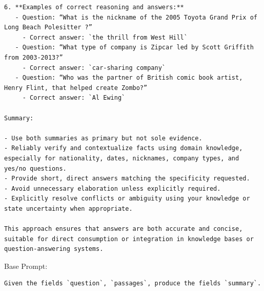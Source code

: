 \begin{instructbox}
\begin{lstlisting}[breakindent=0pt, breaklines=true, breakatwhitespace=true, frame=single, backgroundcolor=\color{blue!10}]
6. **Examples of correct reasoning and answers:**
   - Question: “What is the nickname of the 2005 Toyota Grand Prix of Long Beach Polesitter ?”
     - Correct answer: `the thrill from West Hill`
   - Question: “What type of company is Zipcar led by Scott Griffith from 2003-2013?”
     - Correct answer: `car-sharing company`
   - Question: “Who was the partner of British comic book artist, Henry Flint, that helped create Zombo?”
     - Correct answer: `Al Ewing`

Summary:

- Use both summaries as primary but not sole evidence.
- Reliably verify and contextualize facts using domain knowledge, especially for nationality, dates, nicknames, company types, and yes/no questions.
- Provide short, direct answers matching the specificity requested.
- Avoid unnecessary elaboration unless explicitly required.
- Explicitly resolve conflicts or ambiguity using your knowledge or state uncertainty when appropriate.

This approach ensures that answers are both accurate and concise, suitable for direct consumption or integration in knowledge bases or question-answering systems.
\end{lstlisting}
\end{instructbox}\begin{instructbox}
Base Prompt:
\begin{lstlisting}[breakindent=0pt, breaklines=true, breakatwhitespace=true, frame=single, backgroundcolor=\color{gray!10}]
Given the fields `question`, `passages`, produce the fields `summary`.
\end{lstlisting}


\end{instructbox}
